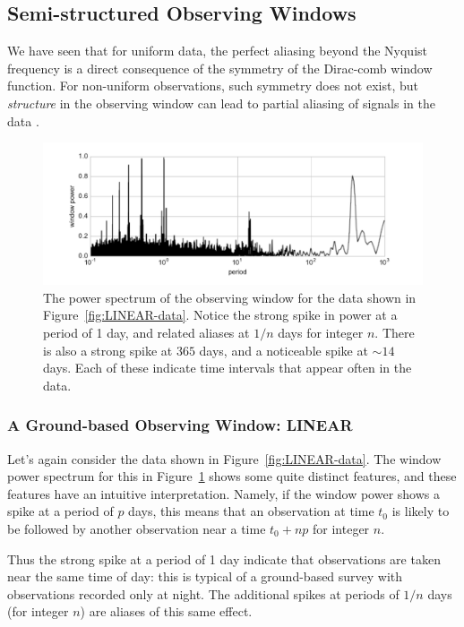 \documentclass[preprint]{aastex}
\newcommand{\fig}[1]{Figure~\ref{fig:#1}}
\newcommand{\figlabel}[1]{\label{fig:#1}}
\begin{document}
\subsection{Semi-structured Observing Windows}

We have seen that for uniform data, the perfect aliasing beyond the Nyquist
frequency is a direct consequence of the symmetry of the Dirac-comb window
function.
For non-uniform observations, such symmetry does not exist, but {\it structure}
in the observing window can lead to partial aliasing of signals in the
data \citep[see, e.g.][]{Deeming75}.


\begin{figure}[ht]
  \centering
  \includegraphics[width=\textwidth]{fig14_LINEAR_window}
  \caption{The power spectrum of the observing window for the data shown
    in \fig{LINEAR-data}. Notice the strong spike in power at a period of
    1 day, and related aliases at $1/n$ days for integer $n$.
    There is also a strong spike at $365$ days, and a noticeable spike at
    $\sim 14$ days. Each of these indicate time intervals that appear often
    in the data.
    \figlabel{LINEAR-window}}
\end{figure}

\subsubsection{A Ground-based Observing Window: LINEAR}

Let's again consider the data shown in \fig{LINEAR-data}. The window power
spectrum for this in \fig{LINEAR-window} shows some quite distinct features,
and these features have an intuitive interpretation.
Namely, if the window power shows a spike at a period of $p$ days, this means
that an observation at time $t_0$ is likely to be followed by another
observation near a time $t_0 + np$ for integer $n$.

Thus the strong spike at a period of 1 day indicate that observations are
taken near the same time of day: this is typical of a ground-based survey
with observations recorded only at night.
The additional spikes at periods of $1/n$ days (for integer $n$) are aliases
of this same effect.
\end{document}
